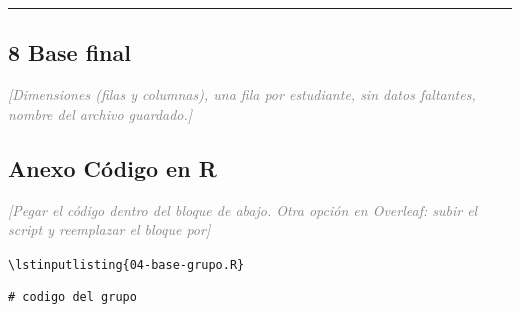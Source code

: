 \documentclass[11pt,letterpaper]{article}
\newcommand{\completar}[1]{\textcolor{gray}{\textit{[#1]}}}
\begin{document}
\medskip\hrule\medskip

\subsection*{8 \; Base final}

\completar{Dimensiones (filas y columnas), una fila por estudiante, sin
datos faltantes, nombre del archivo guardado.}

\newpage
\subsection*{Anexo \; Código en R}

\completar{Pegar el código dentro del bloque de abajo. Otra opción en
Overleaf: subir el script y reemplazar el bloque por}

\begin{center}
\texttt{\textbackslash lstinputlisting\{04-base-grupo.R\}}
\end{center}

\begin{lstlisting}
# codigo del grupo
\end{lstlisting}
\end{document}
